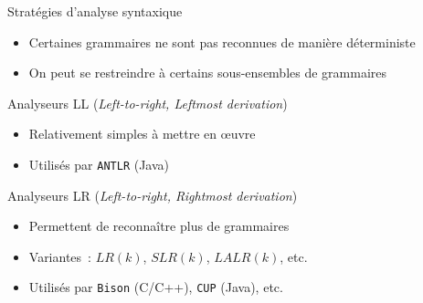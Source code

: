 
\begingroup

\begin{frame}{Stratégies d’analyse syntaxique}

  \begin{itemize}
    \item Certaines grammaires ne sont pas reconnues de manière déterministe
    \item On peut se restreindre à certains sous-ensembles de grammaires
  \end{itemize}

  \begin{block}{Analyseurs LL (\emph{Left-to-right, Leftmost derivation})}
    \begin{itemize}
      \item Relativement simples à mettre en œuvre
      \item Utilisés par \texttt{ANTLR} (Java)
    \end{itemize}
  \end{block}

  \begin{block}{Analyseurs LR (\emph{Left-to-right, Rightmost derivation})}
    \begin{itemize}
      \item Permettent de reconnaître plus de grammaires
      \item Variantes : $LR(k)$, $SLR(k)$, $LALR(k)$, etc.
      \item Utilisés par \texttt{Bison} (C/C++), \texttt{CUP} (Java), etc.
    \end{itemize}
  \end{block}

\end{frame}

\endgroup
\endinput

